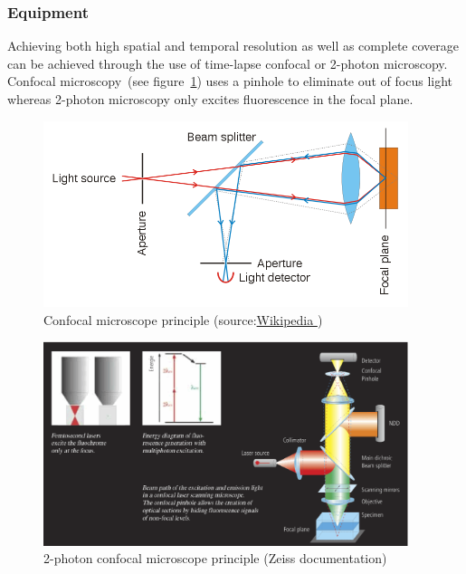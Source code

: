\subsubsection{Equipment}

Achieving both high spatial and temporal resolution as well as complete coverage
can be achieved through the use of time-lapse confocal or 2-photon microscopy.
Confocal microscopy~(see figure~\ref{fig:ConfocalPrinciple}) uses a pinhole to
eliminate out of focus light whereas 2-photon microscopy only excites
fluorescence in the focal plane.

\begin{figure}[htb]
\begin{center}
\leavevmode
 \includegraphics[width=0.95\textwidth]{pictures/ConfocalPrinciple}
\end{center}
\caption{Confocal microscope principle
(source:\href{http://en.wikipedia.org/wiki/File:Confocalprinciple.svg}{Wikipedia
})}
\label{fig:ConfocalPrinciple}
\end{figure}

\begin{figure}[htb]
\begin{center}
\leavevmode
 \includegraphics[width=0.95\textwidth]{pictures/ConfocalZeissPrinciple}
\end{center}
\caption{2-photon confocal microscope principle (Zeiss documentation)}
\label{fig:Confocal2photonsPrinciple}
\end{figure}

